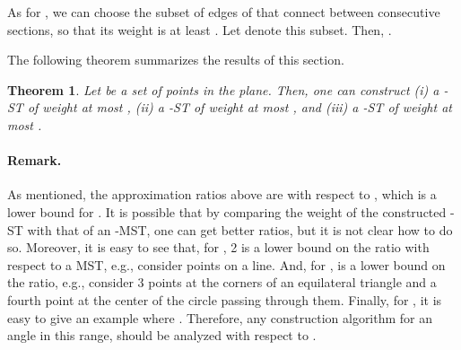 \documentclass[11pt]{article}
\newtheorem{theorem}{Theorem}[section]
\newcommand{\old}[1]{{{}}}
\begin{document}
As for , we can choose the subset of edges of  that connect between consecutive sections, so that its weight is at least . Let  denote this subset. Then, 
.
 
The following theorem summarizes the results of this section.
\begin{theorem}
Let  be a set of points in the plane. Then, one can construct (i) a -ST
of weight at most , (ii) a -ST of weight at most , and
(iii) a -ST of weight at most .
\end{theorem}

\paragraph{Remark.} As mentioned, the approximation ratios above are with respect to , which is a lower bound for . It is possible that by comparing the weight of the constructed -ST with that of an -MST, one can get better ratios, but it is not clear how to do so.
Moreover, it is easy to see that, for , 2 is a lower bound on the ratio with respect to a MST, e.g., consider  points on a line. And, for ,  is a lower bound on the ratio, e.g., consider 3 points at the corners of an equilateral triangle and a fourth point at the center of the circle passing through them. 
Finally, for , it is easy to give an example where . Therefore, any construction algorithm for an angle  in this range, should be analyzed with respect to .   
\old{
\paragraph{Remark.} As mentioned, the approximation ratios above are with respect to the weight of a MST, which is a lower bound for the weight of an -MST. It is possible that by comparing the weight of the constructed -ST with that of an -MST, one can get better ratios, but it is not clear how to do so.
Moreover, it is easy to see that, for , 2 is a lower bound on the ratio with respect to a MST, e.g., consider  points on a line. And, for ,  is a lower bound on the ratio, e.g., consider 3 points at the corners of an equilateral triangle and a fourth point at the center of the circle passing through them. 
}
\end{document}
